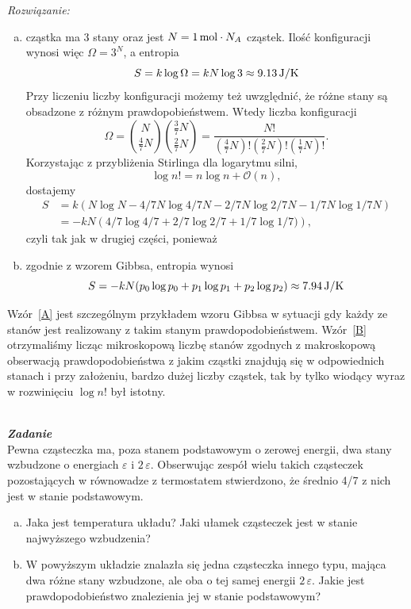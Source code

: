 \documentclass[11pt,a4paper]{article}
\newcounter{zadanie}\newcommand{\zadanie}[1][]{\addtocounter{zadanie}{1} ~\\  {\bf \emph{Zadanie \arabic{zadanie} #1 }} \\}
\begin{document}
{\em Rozwiązanie:}
\begin{enumerate}[a)]
\item cząstka ma $3$ stany oraz jest $N = 1\,{\rm mol} \cdot N_A$ cząstek. Ilość konfiguracji wynosi więc $\Omega = 3^{N}$, a entropia
\begin{equation}
	S = k \log \Omega = k N \log 3 \approx 9.13\,{\rm J/K} \label{A}
\end{equation}
Przy liczeniu liczby konfiguracji możemy też uwzględnić, że różne stany są obsadzone z różnym prawdopobieństwem. Wtedy liczba konfiguracji
\begin{equation}
	\Omega = \binom{N}{\frac{4}{7}N} \binom{\frac{3}{7}N}{\frac{2}{7}N} = \frac{N!}{(\frac{4}{7}N)! (\frac{2}{7}N)! (\frac{1}{7}N)!}.
\end{equation}
Korzystając z przybliżenia Stirlinga dla logarytmu silni,
\begin{equation}
	\log n! = n \log n + \mathcal{O}(n),
\end{equation}
dostajemy
\begin{align}
	S &= k \left(N \log N - 4/7 N \log 4/7 N - 2/7 N \log 2/7 N - 1/7 N \log 1/7 N\right) \nonumber \\
	&= - k N \left(4/7 \log 4/7 + 2/7 \log 2/7 + 1/7 \log 1/7)\right), \label{B}
\end{align}
czyli tak jak w drugiej części, ponieważ

\item zgodnie z wzorem Gibbsa, entropia wynosi
\begin{equation}
	S = - k N (p_0 \log p_0 + p_1 \log p_1 + p_2 \log p_2) \approx 7.94\,{\rm J/K}
\end{equation}
\end{enumerate}
Wzór~\eqref{A} jest szczególnym przykładem wzoru Gibbsa w sytuacji gdy każdy ze stanów jest realizowany z takim stanym prawdopodobieństwem. Wzór~\eqref{B} otrzymaliśmy licząc mikroskopową liczbę  stanów zgodnych z makroskopową obserwacją prawdopodobieństwa z jakim cząstki znajdują się w odpowiednich stanach i przy założeniu, bardzo dużej liczby cząstek, tak by tylko wiodący wyraz w rozwinięciu $\log n!$ był istotny.

\newpage


\zadanie
Pewna cząsteczka ma, poza stanem podstawowym o zerowej energii, dwa stany wzbudzone o energiach $\varepsilon$ i $2\,\varepsilon$.
Obserwując zespół wielu takich cząsteczek pozostających w równowadze z 
termostatem stwierdzono, że średnio 4/7 z nich jest w stanie podstawowym.
\begin{enumerate}[a)]
\item Jaka jest temperatura układu? 
      Jaki ułamek cząsteczek jest w stanie najwyższego wzbudzenia?
\item W powyższym układzie znalazła się jedna cząsteczka innego typu, 
      mająca dwa różne stany wzbudzone, ale oba o tej samej energii $2\,\varepsilon$. 
      Jakie jest prawdopodobieństwo znalezienia jej w stanie podstawowym?
\end{enumerate}
\end{document}
